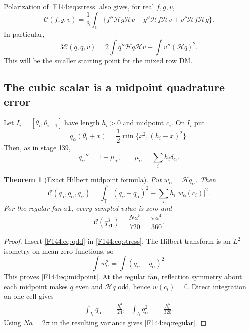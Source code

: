\documentclass[11pt]{amsart}
\numberwithin{equation}{section}
\newtheorem{theorem}{Theorem}[section]
\theoremstyle{definition}
\theoremstyle{remark}
\newcommand{\T}{\mathbb T}
\newcommand{\Hil}{\mathcal H}
\newcommand{\Cnull}{\mathcal C}
\begin{document}
Polarization of \eqref{F144:eq:stress} also gives, for real $f,g,v$,
\begin{equation}\label{F144:eq:polarized-stress}
 \Cnull(f,g,v)=\frac13\int_\T
 \{f''\Hil g\Hil v+g''\Hil f\Hil v+v''\Hil f\Hil g\}.
\end{equation}
In particular,
\begin{equation}\label{F144:eq:q-q-v}
 3\Cnull(q,q,v)
 =2\int q''\Hil q\Hil v+\int v''(\Hil q)^2.
\end{equation}
This will be the smaller starting point for the mixed row DM.

\subsection{The cubic scalar is a midpoint quadrature error}

Let $I_i=[\theta_i,\theta_{i+1}]$ have length $h_i>0$ and midpoint
$c_i$.  On $I_i$ put
\begin{equation}\label{F144:eq:q}
 q_\alpha(\theta_i+x)=\frac12\min\{x^2,(h_i-x)^2\}.
\end{equation}
Then, as in stage 139,
\begin{equation}\label{F144:eq:qdd}
 q_\alpha''=1-\mu_\alpha,
 \qquad \mu_\alpha=\sum_i h_i\delta_{c_i}.
\end{equation}

\begin{theorem}[Exact Hilbert midpoint formula]
\label{F144:thm:midpoint}
Put $w_\alpha=\Hil q_\alpha$.  Then
\begin{equation}\label{F144:eq:midpoint}
 \boxed{
 \Cnull(q_\alpha,q_\alpha,q_\alpha)
 =\int_\T(q_\alpha-\overline q_\alpha)^2
 -\sum_i h_i|w_\alpha(c_i)|^2.}
\end{equation}
For the regular fan $a\mathbf1$, every sampled value is zero and
\begin{equation}\label{F144:eq:regular}
 \Cnull(q_{a\mathbf1}^3)=\frac{Na^5}{720}
 =\frac{\pi a^4}{360}.
\end{equation}
\end{theorem}

\begin{proof}
Insert \eqref{F144:eq:qdd} in \eqref{F144:eq:stress}.  The Hilbert transform is an
$L^2$ isometry on mean-zero functions, so
\begin{equation*}
 \int w_\alpha^2=\int(q_\alpha-\overline q_\alpha)^2.
\end{equation*}
This proves \eqref{F144:eq:midpoint}.  At the regular fan, reflection symmetry
about each midpoint makes $q$ even and $\Hil q$ odd, hence
$w(c_i)=0$.  Direct integration on one cell gives
\begin{align}
 \int_{I_i}q_\alpha&=\frac{h_i^3}{24},&
 \int_{I_i}q_\alpha^2&=\frac{h_i^5}{320}.
 \label{F144:eq:cell-integrals}
\end{align}
Using $Na=2\pi$ in the resulting variance gives \eqref{F144:eq:regular}.
\end{proof}
\end{document}
